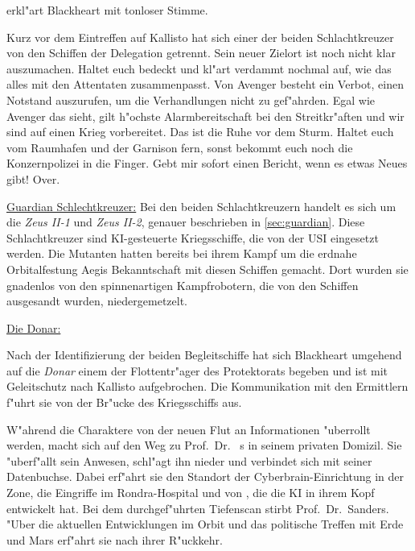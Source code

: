 erkl"art Blackheart mit tonloser Stimme. 

\begin{speech}
	Kurz vor dem Eintreffen auf Kallisto hat sich einer der beiden Schlachtkreuzer von den Schiffen der Delegation getrennt. Sein neuer Zielort ist noch nicht klar auszumachen. Haltet euch bedeckt und kl"art verdammt nochmal auf, wie das alles mit den Attentaten zusammenpasst. Von Avenger besteht ein Verbot, einen Notstand auszurufen, um die Verhandlungen nicht zu gef"ahrden. Egal wie Avenger das sieht, gilt h"ochste Alarmbereitschaft bei den Streitkr"aften und wir sind auf einen Krieg vorbereitet. Das ist die Ruhe vor dem Sturm. Haltet euch vom Raumhafen und der Garnison fern, sonst bekommt euch noch die Konzernpolizei in die Finger. Gebt mir sofort einen Bericht, wenn es etwas Neues gibt! Over.
\end{speech}

\begin{remarks}
	\underline{Guardian Schlechtkreuzer:}
	Bei den beiden Schlachtkreuzern handelt es sich um die \emph{Zeus II-1} und \emph{Zeus II-2}, genauer beschrieben in \cref{sec:guardian}. Diese Schlachtkreuzer sind KI-gesteuerte Kriegsschiffe, die von der USI eingesetzt werden. Die Mutanten hatten bereits bei ihrem Kampf um die erdnahe Orbitalfestung Aegis Bekanntschaft mit diesen Schiffen gemacht. Dort wurden sie gnadenlos von den spinnenartigen Kampfrobotern, die von den Schiffen ausgesandt wurden, niedergemetzelt.

	\underline{Die Donar:}

	Nach der Identifizierung der beiden Begleitschiffe hat sich Blackheart umgehend auf die \emph{Donar} einem der Flottentr"ager des Protektorats begeben und ist mit Geleitschutz nach Kallisto aufgebrochen. Die Kommunikation mit den Ermittlern f"uhrt sie von der Br"ucke des Kriegsschiffs aus.
\end{remarks}


W"ahrend die Charaktere von der neuen Flut an Informationen "uberrollt werden, macht sich \xl{} auf den Weg zu Prof.~Dr.~	s in seinem privaten Domizil. Sie "uberf"allt sein Anwesen, schl"agt ihn nieder und verbindet sich mit seiner Datenbuchse. Dabei erf"ahrt sie den Standort der Cyberbrain-Einrichtung in der Zone, die Eingriffe im Rondra-Hospital und von \ml{}, die die KI in ihrem Kopf entwickelt hat. Bei dem durchgef"uhrten Tiefenscan stirbt Prof.~Dr.~Sanders. "Uber die aktuellen Entwicklungen im Orbit und das politische Treffen mit Erde und Mars erf"ahrt sie nach ihrer R"uckkehr.

